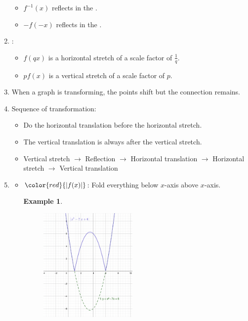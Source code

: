 \documentclass[12pt, a4paper]{article}
\newtheorem{example}{Example}[subsection]
\begin{document}
\begin{enumerate}
\begin{itemize}
        \item $f^{-1}(x)$ reflects in the {\color{red}{$y=x$}}.
        \item $-f(-x)$ reflects in the {\color{red}{origin}}.  
    \end{itemize}
    \item \textbf{\color{red}{Stretches}}: 
    \begin{itemize}
        \item $f(qx)$ is a horizontal stretch of a scale factor of $\displaystyle\frac{1}{q}$.
        \item $pf(x)$ is a vertical stretch of a scale factor of $p$.
    \end{itemize}
    \item When a graph is transforming, the points shift but the connection remains. 
    \item Sequence of transformation: 
    \begin{itemize}
        \item Do the horizontal translation before the horizontal stretch.
        \item The vertical translation is always after the vertical stretch.
        \item Vertical stretch $\rightarrow$ Reflection $\rightarrow$ Horizontal translation $\rightarrow$ Horizontal stretch $\rightarrow$ Vertical translation
    \end{itemize}
    \item \textbf{\color{red}{Modulus Function}}
    \begin{itemize}
        \item ${\color{red}{\left|f(x)\right|}}$: Fold everything below $x$-axis above $x$-axis. 
        \begin{example}
        \begin{figure}[H]
            \centering
            \includegraphics[width=0.48\textwidth]{Fig.2.10.jpg}

\end{figure}
\end{example}
\end{itemize}
\end{enumerate}
\end{document}
